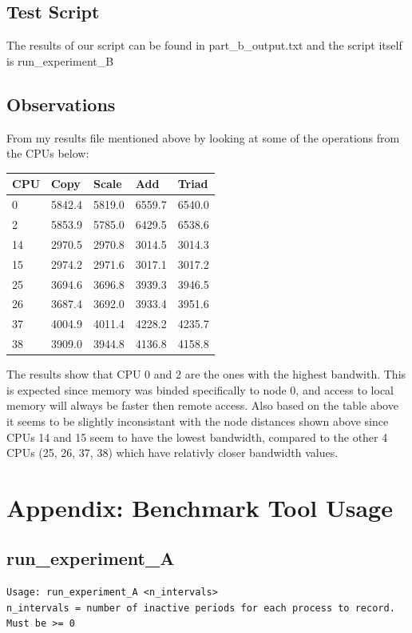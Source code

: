 \documentclass{article}
\begin{document}
\subsection{Test Script}

The results of our script can be found in part\_b\_output.txt and the script itself is run\_experiment\_B

\subsection{Observations}

From my results file mentioned above by looking at some of the operations from the CPUs below:

\begin{center}
\begin{tabular}{|l|l|l|l|l|}
	\hline 
	CPU & Copy & Scale & Add & Triad \\ \hline
	0 & 5842.4 & 5819.0 & 6559.7 & 6540.0 \\ \hline
	2 & 5853.9 & 5785.0 & 6429.5 & 6538.6 \\ \hline
	14 & 2970.5 & 2970.8 & 3014.5 & 3014.3 \\ \hline
	15 & 2974.2 & 2971.6 & 3017.1 & 3017.2 \\ \hline
	25 & 3694.6 & 3696.8 & 3939.3 & 3946.5 \\ \hline
	26 & 3687.4 & 3692.0 & 3933.4 & 3951.6 \\ \hline
	37 & 4004.9 & 4011.4 & 4228.2 & 4235.7 \\ \hline
	38 & 3909.0 & 3944.8 & 4136.8 & 4158.8 \\ \hline

\end{tabular}
\end{center}

The results show that CPU 0 and 2 are the ones with the highest bandwith.
This is expected since memory was binded specifically to node 0, and access to local memory will always be faster then remote access.
Also based on the table above it seems to be slightly inconsistant with the node distances shown above since CPUs 14 and 15 seem to have the lowest bandwidth, compared to the other 4 CPUs (25, 26, 37, 38) which have relativly closer bandwidth values.

\section{Appendix: Benchmark Tool Usage}
\subsection{run\_experiment\_A}
\begin{lstlisting}
Usage: run_experiment_A <n_intervals>
n_intervals = number of inactive periods for each process to record. Must be >= 0 
\end{lstlisting}
\end{document}
